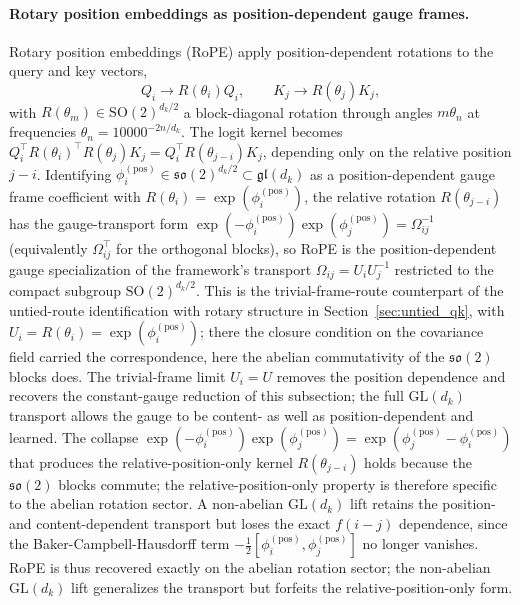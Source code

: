 \documentclass[11pt]{article}
\begin{document}
\paragraph{Rotary position embeddings as position-dependent gauge frames.}
Rotary position embeddings (RoPE) \cite{su2024roformer} apply position-dependent rotations to the query and key vectors,
\begin{equation}
Q_i \to R(\theta_i) Q_i, \qquad K_j \to R(\theta_j) K_j,
\label{eq:rope_apply}
\end{equation}
with $R(\theta_m) \in \mathrm{SO}(2)^{d_k/2}$ a block-diagonal rotation through angles $m\theta_n$ at frequencies $\theta_n = 10000^{-2n/d_k}$. The logit kernel becomes $Q_i^\top R(\theta_i)^\top R(\theta_j) K_j = Q_i^\top R(\theta_{j-i}) K_j$, depending only on the relative position $j - i$. Identifying $\phi_i^{(\mathrm{pos})} \in \mathfrak{so}(2)^{d_k/2} \subset \mathfrak{gl}(d_k)$ as a position-dependent gauge frame coefficient with $R(\theta_i) = \exp(\phi_i^{(\mathrm{pos})})$, the relative rotation $R(\theta_{j-i})$ has the gauge-transport form $\exp(-\phi_i^{(\mathrm{pos})})\exp(\phi_j^{(\mathrm{pos})}) = \Omega_{ij}^{-1}$ (equivalently $\Omega_{ij}^\top$ for the orthogonal blocks), so RoPE is the position-dependent gauge specialization of the framework's transport $\Omega_{ij} = U_iU_j^{-1}$ restricted to the compact subgroup $\mathrm{SO}(2)^{d_k/2}$. This is the trivial-frame-route counterpart of the untied-route identification with rotary structure in Section~\ref{sec:untied_qk}, with $U_i = R(\theta_i) = \exp(\phi_i^{(\mathrm{pos})})$; there the closure condition on the covariance field carried the correspondence, here the abelian commutativity of the $\mathfrak{so}(2)$ blocks does. The trivial-frame limit $U_i = U$ removes the position dependence and recovers the constant-gauge reduction of this subsection; the full $\mathrm{GL}(d_k)$ transport allows the gauge to be content- as well as position-dependent and learned. The collapse $\exp(-\phi_i^{(\mathrm{pos})})\exp(\phi_j^{(\mathrm{pos})}) = \exp(\phi_j^{(\mathrm{pos})} - \phi_i^{(\mathrm{pos})})$ that produces the relative-position-only kernel $R(\theta_{j-i})$ holds because the $\mathfrak{so}(2)$ blocks commute; the relative-position-only property is therefore specific to the abelian rotation sector. A non-abelian $\mathrm{GL}(d_k)$ lift retains the position- and content-dependent transport but loses the exact $f(i-j)$ dependence, since the Baker-Campbell-Hausdorff term $-\tfrac{1}{2}[\phi_i^{(\mathrm{pos})}, \phi_j^{(\mathrm{pos})}]$ no longer vanishes. RoPE is thus recovered exactly on the abelian rotation sector; the non-abelian $\mathrm{GL}(d_k)$ lift generalizes the transport but forfeits the relative-position-only form.
\end{document}
